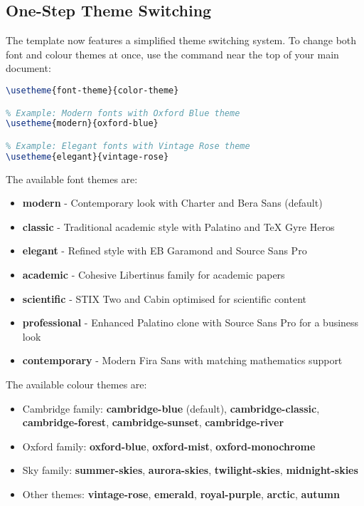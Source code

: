 \documentclass[a4paper,11pt]{article}
\begin{document}
\subsection{One-Step Theme Switching}
The template now features a simplified theme switching system. To change both font and colour themes at once, use the \inlinecode{\\usetheme} command near the top of your main document:

\begin{lstlisting}[language=TeX, caption={Using the theme switcher command}, label={lst:themeswitcher}]
% Select your theme - first parameter is font theme, second is color theme
\usetheme{font-theme}{color-theme}

% Example: Modern fonts with Oxford Blue theme
\usetheme{modern}{oxford-blue}

% Example: Elegant fonts with Vintage Rose theme
\usetheme{elegant}{vintage-rose}
\end{lstlisting}

The available font themes are:
\begin{itemize}
    \item \textbf{modern} - Contemporary look with Charter and Bera Sans (default)
    \item \textbf{classic} - Traditional academic style with Palatino and TeX Gyre Heros
    \item \textbf{elegant} - Refined style with EB Garamond and Source Sans Pro
    \item \textbf{academic} - Cohesive Libertinus family for academic papers
    \item \textbf{scientific} - STIX Two and Cabin optimised for scientific content
    \item \textbf{professional} - Enhanced Palatino clone with Source Sans Pro for a business look
    \item \textbf{contemporary} - Modern Fira Sans with matching mathematics support
\end{itemize}

The available colour themes are:
\begin{itemize}
    \item Cambridge family: \textbf{cambridge-blue} (default), \textbf{cambridge-classic}, \textbf{cambridge-forest}, \textbf{cambridge-sunset}, \textbf{cambridge-river}
    \item Oxford family: \textbf{oxford-blue}, \textbf{oxford-mist}, \textbf{oxford-monochrome}
    \item Sky family: \textbf{summer-skies}, \textbf{aurora-skies}, \textbf{twilight-skies}, \textbf{midnight-skies}
    \item Other themes: \textbf{vintage-rose}, \textbf{emerald}, \textbf{royal-purple}, \textbf{arctic}, \textbf{autumn}
\end{itemize}
\end{document}
